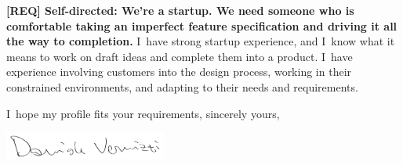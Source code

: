 \documentclass[a4paper,sans]{moderncv} %
\begin{document}
\textbf{[REQ] Self-directed: We’re a startup. We need someone who is comfortable taking an imperfect feature specification and driving it all the way to completion.}
I~have strong startup experience, and I~know what it means to work on draft ideas and complete them into a product. I~have experience involving customers into the design process, working in their constrained environments, and adapting to their needs and requirements.

I~hope my profile fits your requirements, sincerely yours,

\vspace{1.5em}

\includegraphics[width=0.4\textwidth]{FirmaPenna}
\makeletterclosing %


\end{document}
